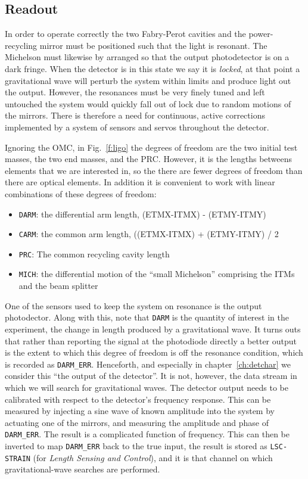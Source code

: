 \subsection{Readout}
\label{ssec:readout}

In order to operate correctly the two Fabry-Perot cavities and the
power-recycling mirror must be positioned such that the light is
resonant.  The Michelson must likewise by arranged so that the output
photodetector is on a dark fringe.  When the detector is in this
state we say it is \emph{locked}, at that point a gravitational wave
will perturb the system within limits and produce light out the
output.  However, the resonances must be very finely tuned and left
untouched the system would quickly fall out of lock due to random
motions of the mirrors.  There is therefore a need for continuous,
active corrections implemented by a system of sensors and servos
throughout the detector.

Ignoring the OMC, in Fig.~\ref{f:ligo} the degrees of freedom are
the two initial test masses, the two end masses, and the PRC.
However, it is the lengths betweens elements that we are interested
in, so the there are fewer degrees of freedom than there are optical
elements.  In addition it is convenient to work with linear
combinations of these degrees of freedom:

\begin{itemize}
\item \texttt{DARM}: the differential arm length, (ETMX-ITMX) -
(ETMY-ITMY)
\item \texttt{CARM}: the common arm length, ((ETMX-ITMX) +
(ETMY-ITMY) / 2
\item \texttt{PRC}: The common recycling cavity length
\item \texttt{MICH}: the differential motion of the ``small Michelson'' comprising
the ITMs and the beam splitter
\end{itemize}

One of the sensors used to keep the system on resonance is the output
photodector.  Along with this, note that \texttt{DARM} is the quantity
of interest in the experiment, the change in length produced by a
gravitational wave.    It turns outs that rather than reporting the
signal at the photodiode directly a better output is the extent to
which this degree of freedom is off the resonance condition, which is
recorded as \texttt{DARM\_ERR}.  Henceforth, and especially in
chapter~\ref{ch:detchar} we consider this ``the output of the
detector''.  It is not, however, the data stream in which we will
search for gravitational waves.  The detector output needs to be
calibrated with respect to the detector's frequency response.  This
can be measured by injecting a sine wave of known amplitude into the
system by actuating one of the mirrors, and measuring the amplitude
and phase of \texttt{DARM\_ERR}.  The result is a complicated function of
frequency.  This can then be inverted to map \texttt{DARM\_ERR} back to the true
input, the result is stored as \texttt{LSC-STRAIN} (for \emph{Length
Sensing and Control}), and it is that channel on which
gravitational-wave searches are performed.

